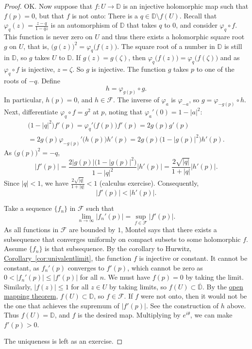 \documentclass[12pt,openany]{book}
\newcommand{\sabs}[1]{\lvert {#1} \rvert}
\newcommand{\D}{{\mathbb{D}}}
\newcommand{\sF}{{\mathscr{F}}}
\theoremstyle{plain}
\theoremstyle{remark}
\theoremstyle{definition}
\theoremstyle{exercise}
\theoremstyle{example}
\newcommand{\corref}[1]{\hyperref[#1]{Corollary~\ref*{#1}}}
\begin{document}
\begin{proof}
OK\@.  Now suppose that $f \colon U \to \D$ is an injective holomorphic map
such that $f(p) = 0$, but that $f$ is not onto: There is a
$q \in \D \setminus f(U)$.
Recall that
$\varphi_q(z) = \frac{z-q}{1-\bar{q}z}$ is an automorphism of $\D$ that
takes $q$ to $0$, and consider $\varphi_q \circ f$.  This function is never
zero on $U$ and thus
there exists a holomorphic square root $g$ on $U$, that is,
${\bigl(g(z)\bigr)}^2 = \varphi_q\bigl(f(z)\bigr)$.
The square root of a number in $\D$ is still in $\D$, so $g$
takes $U$ to $\D$.
If $g(z)=g(\zeta)$, then $\varphi_q\bigl(f(z)\bigr)=\varphi_q\bigl(f(\zeta)\bigr)$ and as
$\varphi_q \circ f$ is injective, $z=\zeta$.  So $g$ is injective.  
The function $g$ takes $p$ to one of the roots of $-q$.
Define
\begin{equation*}
h = \varphi_{g(p)} \circ g .
\end{equation*}
In particular, $h(p) = 0$, and $h \in \sF$.
The inverse of $\varphi_a$ is $\varphi_{-a}$, so
$g = \varphi_{-g(p)} \circ h$.
Next, differentiate
$\varphi_q \circ f = g^2$ at $p$, noting that
$\varphi_a'(0) = 1-\sabs{a}^2$:
\begin{multline*}
\bigl(1-\sabs{q}^2\bigr) f'(p)
= \varphi_q'\bigl(f(p)\bigr) f'(p)
= 2 g(p) g'(p)
\\
= 2 g(p) \varphi_{-g(p)}'\bigl(h(p)\bigr) h'(p)
= 2 g(p) \bigl(1-\sabs{g(p)}^2\bigr) h'(p) .
\end{multline*}
As ${\bigl(g(p)\bigr)}^2 = -q$,
\begin{equation*}
\sabs{f'(p)} =
\frac{2 \sabs{g(p)} \bigl(1-\sabs{g(p)}^2\bigr)}{1-\sabs{q}^2} \sabs{h'(p)}
=
\frac{2 \sqrt{\sabs{q}}}{1+\sabs{q}} \sabs{h'(p)} .
\end{equation*}
Since $\sabs{q} < 1$, we have $\frac{2 \sqrt{\sabs{q}}}{1+\sabs{q}} < 1$
(calculus exercise).
Consequently,
\begin{equation*}
\sabs{f'(p)} < \sabs{h'(p)} .
\end{equation*}

Take a sequence $\{ f_n \}$ in
$\sF$ such that
\begin{equation*}
\lim_{n \to \infty} \sabs{f_n'(p)} = \sup_{f \in \sF} \sabs{f'(p)} .
\end{equation*}
As all functions in $\sF$ are bounded by $1$,
Montel says that there exists a subsequence that converges uniformly on
compact subsets to some holomorphic $f$.  Assume $\{ f_n \}$ is that subsequence.
By the corollary to Hurwitz,
\corref{cor:univalentlimit},
the function $f$ is injective or constant.  It cannot be constant,
as $f_n'(p)$ converges to $f'(p)$, which
cannot be zero as  
$0 < \sabs{f_n'(p)} \leq \sabs{f'(p)}$ for all $n$.
We must have $f(p) = 0$ by taking the limit.
Similarly,
$\sabs{f(z)} \leq 1$ for all $z \in U$ by taking limits,
so $f(U) \subset \overline{\D}$.
By the \hyperref[thm:OMT]{open mapping theorem}, $f(U) \subset \D$, so $f \in
\sF$.  If $f$ were not onto, then it would not be the one that achieves the
supremum of $\sabs{f'(p)}$.  See the construction of $h$ above.
Thus $f(U) = \D$, and $f$ is the desired map.
Multiplying by $e^{i\theta}$, we can make $f'(p) > 0$.

The uniqueness is left as an exercise.
\end{proof}
\end{document}
